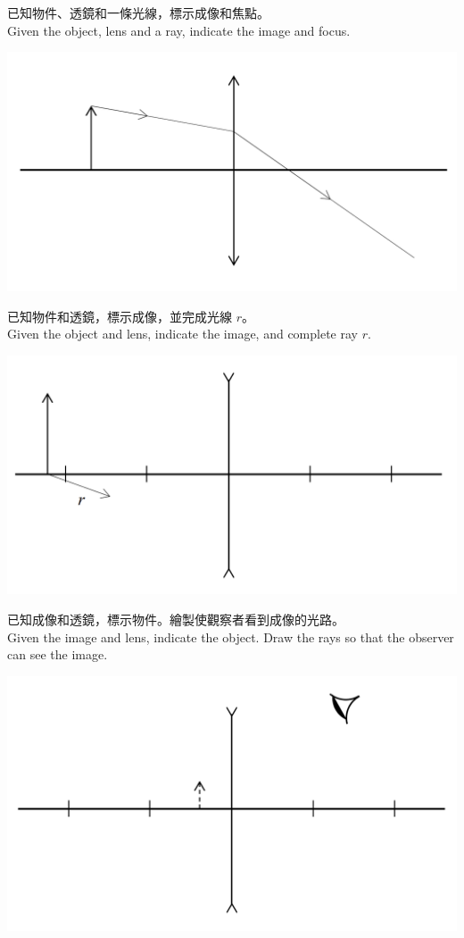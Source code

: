 \documentclass[class=exam, crop=false]{standalone}
\begin{document}
\begin{questions}
    \filbreak\question
    已知物件、透鏡和一條光線，標示成像和焦點。\\Given the object, lens and a ray, indicate the image and focus.
    \par{\par\centering\includegraphics[width=.7\textwidth]{./img/ch45ex_2024-04-26-22-38-03.png}\par}

    \filbreak\question
    已知物件和透鏡，標示成像，並完成光線 $r$。\\Given the object and lens, indicate the image, and complete ray $r$.
    \par{\par\centering\includegraphics[width=.7\textwidth]{./img/ch45ex_2024-04-26-22-38-43.png}\par}

    \filbreak\question
    已知成像和透鏡，標示物件。繪製使觀察者看到成像的光路。\\
    Given the image and lens, indicate the object. Draw the rays so that the observer can see the image.
    \par{\par\centering\includegraphics[width=.7\textwidth]{./img/ch45ex_2024-04-26-22-41-33.png}\par}


\end{questions}
\end{document}
